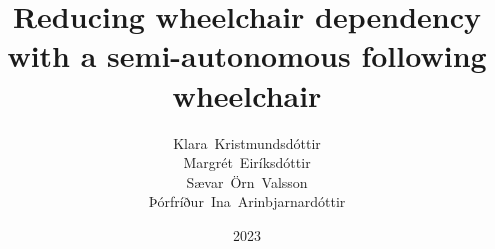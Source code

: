 \documentclass[showtrims]{rubook}
\title{Reducing wheelchair dependency with a semi-autonomous following wheelchair}
\author{Klara~Kristmundsdóttir\\Margrét~Eiríksdóttir\\Sævar~Örn~Valsson \\Þórfríður~Ina~Arinbjarnardóttir}
\date{2023}{2}{16}%
\begin{document}
\maketitle{}
\copyrightpage{}


\enableindents{}%

\clearpage{}
\tableofcontents{}\clearpage
\listoffigures{}\clearpage
\listoftables{}\clearpage

\end{document}
